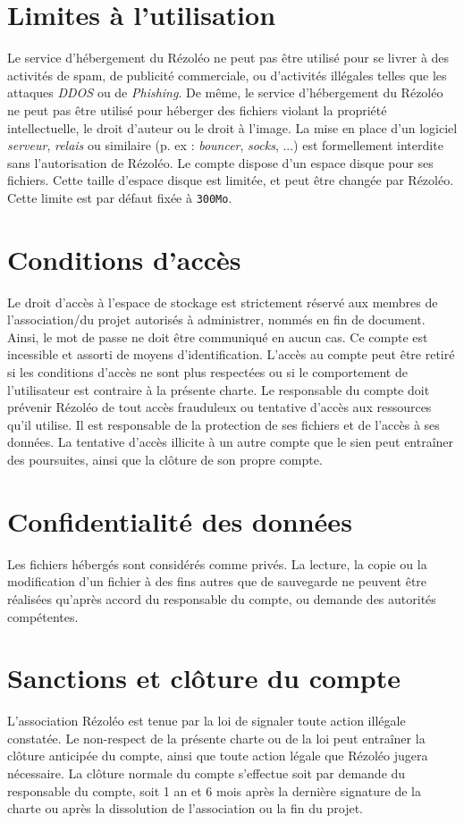\documentclass[11pt, a4paper]{article}
\begin{document}
\section{Limites à l'utilisation}
Le service d'hébergement du Rézoléo ne peut pas être utilisé pour se livrer à des activités de spam, de publicité commerciale, ou d'activités illégales telles que les attaques \textit{DDOS} ou de \textit{Phishing}. De même, le service d'hébergement du Rézoléo ne peut pas être utilisé pour héberger des fichiers violant la propriété intellectuelle, le droit d'auteur ou le droit à l'image. La mise en place d'un logiciel \textit{serveur}, \textit{relais} ou similaire (p. ex : \textit{bouncer}, \textit{socks}, ...) est formellement interdite sans l'autorisation de Rézoléo.
Le compte dispose d'un espace disque pour ses fichiers. Cette taille d'espace disque est limitée, et peut être changée par Rézoléo. Cette limite est par défaut fixée à \texttt{300Mo}.

\section{Conditions d'accès}
Le droit d'accès à l'espace de stockage est strictement réservé aux membres de l'association/du projet autorisés à administrer, nommés en fin de document. Ainsi, le mot de passe ne doit être communiqué en aucun cas. Ce compte est incessible et assorti de moyens d'identification. L'accès au compte peut être retiré si les conditions d'accès ne sont plus respectées ou si le comportement de l'utilisateur est contraire à la présente charte. Le responsable du compte doit prévenir Rézoléo de tout accès frauduleux ou tentative d'accès aux ressources qu'il utilise. Il est responsable de la protection de ses fichiers et de l'accès à ses données. La tentative d'accès illicite à un autre compte que le sien peut entraîner des poursuites, ainsi que la clôture de son propre compte.

\section{Confidentialité des données}
Les fichiers hébergés sont considérés comme privés. La lecture, la copie ou la modification d'un fichier à des fins autres que de sauvegarde ne peuvent être réalisées qu'après accord du responsable du compte, ou demande des autorités compétentes.

\section{Sanctions et clôture du compte}
L'association Rézoléo est tenue par la loi de signaler toute action illégale constatée. Le non-respect de la présente charte ou de la loi peut entraîner la clôture anticipée du compte, ainsi que toute action légale que Rézoléo jugera nécessaire.
La clôture normale du compte s'effectue soit par demande du responsable du compte, soit 1 an et 6 mois après la dernière signature de la charte ou après la dissolution de l'association ou la fin du projet.
\end{document}
